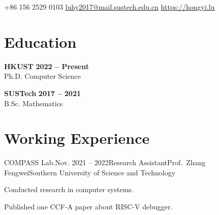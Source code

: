 \documentclass{resume}
\begin{document}
\begin{center}
    \contact
        {+86 156 2529 0103}
        {\href{mailto://luhy2017@mail.sustech.edu.cn}{luhy2017@mail.sustech.edu.cn}}
        {\href{https://hongyi.lu}{https://hongyi.lu}}
\end{center}

\section{Education} 
\begin{content}
    {\bf HKUST}     
    \hfill {\bf 2022
    -- Present} 
    \\ {Ph.D. Computer Science} 

    {\bf SUSTech} \hfill {\bf 2017 -- 
    2021} \\ 
    {B.Sc. Mathematics} \hfill 
    
\sectionlineskip
\end{content}

\section{Working Experience}
\begin{content}

    \begin{position}{COMPASS Lab.}{Nov. 2021 -- 2022}{Research 
    Assistant}{Prof.~Zhang Fengwei}{Southern University of Science and 
    Technology}
    \item Conducted research in computer systems.
    \item Published one CCF-A paper about RISC-V debugger.
    \end{position}

\sectionlineskip
\end{content}
\vspace{-3\medskipamount}

\noindent
\renewcommand{\refname}{Publications}   %
\nocite{*}
\sectionlineskip
\end{document}
